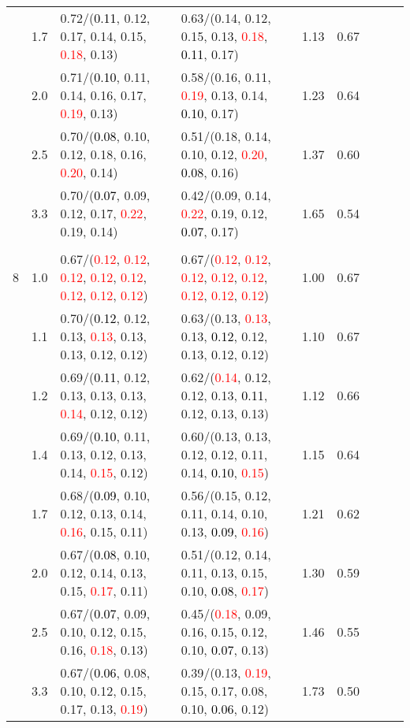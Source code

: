 \documentclass[10pt,a4paper]{report}
\begin{document}
\begin{table}[!htbp]
\begin{center}
{\begin{tabular}{ccllccccc}
			&1.7&0.72/(\textcolor{black}{0.11}, 0.12, 0.17, 0.14, 0.15, \textcolor{red}{0.18}, 0.13)&0.63/(0.14, 0.12, 0.15, 0.13, \textcolor{red}{0.18}, \textcolor{black}{0.11}, 0.17)&1.13&0.67\\
			&2.0&0.71/(\textcolor{black}{0.10}, 0.11, 0.14, 0.16, 0.17, \textcolor{red}{0.19}, 0.13)&0.58/(0.16, 0.11, \textcolor{red}{0.19}, 0.13, 0.14, \textcolor{black}{0.10}, 0.17)&1.23&0.64\\
			&2.5&0.70/(\textcolor{black}{0.08}, 0.10, 0.12, 0.18, 0.16, \textcolor{red}{0.20}, 0.14)&0.51/(0.18, 0.14, 0.10, 0.12, \textcolor{red}{0.20}, \textcolor{black}{0.08}, 0.16)&1.37&0.60\\
			&3.3&0.70/(\textcolor{black}{0.07}, 0.09, 0.12, 0.17, \textcolor{red}{0.22}, 0.19, 0.14)&0.42/(0.09, 0.14, \textcolor{red}{0.22}, 0.19, 0.12, \textcolor{black}{0.07}, 0.17)&1.65&0.54\\
			&&&&\\
			8			&1.0&0.67/(\textcolor{red}{0.12}, \textcolor{red}{0.12}, \textcolor{red}{0.12}, \textcolor{red}{0.12}, \textcolor{red}{0.12}, \textcolor{red}{0.12}, \textcolor{red}{0.12}, \textcolor{red}{0.12})&0.67/(\textcolor{red}{0.12}, \textcolor{red}{0.12}, \textcolor{red}{0.12}, \textcolor{red}{0.12}, \textcolor{red}{0.12}, \textcolor{red}{0.12}, \textcolor{red}{0.12}, \textcolor{red}{0.12})&1.00&0.67\\
			&1.1&0.70/(\textcolor{black}{0.12}, 0.12, 0.13, \textcolor{red}{0.13}, 0.13, 0.13, 0.12, 0.12)&0.63/(0.13, \textcolor{red}{0.13}, 0.13, \textcolor{black}{0.12}, 0.12, 0.13, 0.12, 0.12)&1.10&0.67\\
			&1.2&0.69/(\textcolor{black}{0.11}, 0.12, 0.13, 0.13, 0.13, \textcolor{red}{0.14}, 0.12, 0.12)&0.62/(\textcolor{red}{0.14}, 0.12, 0.12, 0.13, \textcolor{black}{0.11}, 0.12, 0.13, 0.13)&1.12&0.66\\
			&1.4&0.69/(\textcolor{black}{0.10}, 0.11, 0.13, 0.12, 0.13, 0.14, \textcolor{red}{0.15}, 0.12)&0.60/(0.13, 0.13, 0.12, 0.12, 0.11, 0.14, \textcolor{black}{0.10}, \textcolor{red}{0.15})&1.15&0.64\\
			&1.7&0.68/(\textcolor{black}{0.09}, 0.10, 0.12, 0.13, 0.14, \textcolor{red}{0.16}, 0.15, 0.11)&0.56/(0.15, 0.12, 0.11, 0.14, 0.10, 0.13, \textcolor{black}{0.09}, \textcolor{red}{0.16})&1.21&0.62\\
			&2.0&0.67/(\textcolor{black}{0.08}, 0.10, 0.12, 0.14, 0.13, 0.15, \textcolor{red}{0.17}, 0.11)&0.51/(0.12, 0.14, 0.11, 0.13, 0.15, 0.10, \textcolor{black}{0.08}, \textcolor{red}{0.17})&1.30&0.59\\
			&2.5&0.67/(\textcolor{black}{0.07}, 0.09, 0.10, 0.12, 0.15, 0.16, \textcolor{red}{0.18}, 0.13)&0.45/(\textcolor{red}{0.18}, 0.09, 0.16, 0.15, 0.12, 0.10, \textcolor{black}{0.07}, 0.13)&1.46&0.55\\
			&3.3&0.67/(\textcolor{black}{0.06}, 0.08, 0.10, 0.12, 0.15, 0.17, 0.13, \textcolor{red}{0.19})&0.39/(0.13, \textcolor{red}{0.19}, 0.15, 0.17, 0.08, 0.10, \textcolor{black}{0.06}, 0.12)&1.73&0.50\\
			\bottomrule
		\end{tabular}}
	\end{center}
\end{table}
\end{document}
